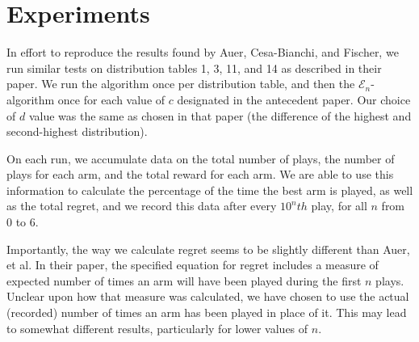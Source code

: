 
\section{Experiments}
\label{sec:expts}

In effort to reproduce the results found by Auer, Cesa-Bianchi, and Fischer,
we run similar tests on distribution tables 1, 3, 11, and 14 as described in their paper.
We run the  algorithm once per distribution table, and then
the $\mathcal{E}_n$- algorithm once for each value of $c$ designated
in the antecedent paper. Our choice of $d$ value was the same as chosen in
that paper (the difference of the highest and second-highest distribution).

On each run, we accumulate data on the total number of plays, the number of plays
for each arm, and the total reward for each arm. We are able to use this information
to calculate the percentage of the time the best arm is played, as well as the total
regret, and we record this data after every $10^nth$ play, for all $n$ from 0 to 6.

Importantly, the way we calculate regret seems to be slightly different than Auer, et al.
In their paper, the specified equation for regret includes a measure of expected number
of times an arm will have been played during the first $n$ plays. Unclear upon how that
measure was calculated, we have chosen to use the actual (recorded) number of times
an arm has been played in place of it. This may lead to somewhat different results, particularly
for lower values of $n$.